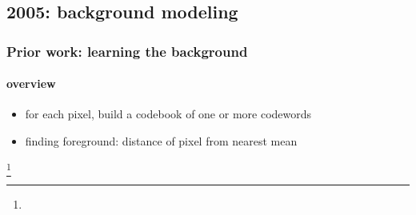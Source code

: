 \subsection{2005: background modeling}
\begin{frame}
\frametitle{Prior work: learning the background}
\framesubtitle{overview}
\mypagenum
	\begin{itemize}
		\item for each pixel, build a codebook of one or more codewords
		\item finding foreground: distance of pixel from nearest mean
	\end{itemize}
\footnote{\tiny {}}
\end{frame}







\printbibliography

